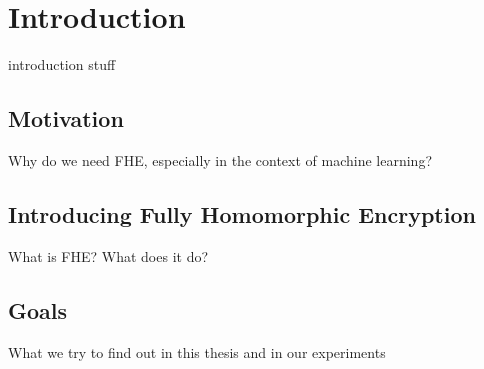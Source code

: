 \chapter{Introduction}\label{intro}

introduction stuff

\section{Motivation}

Why do we need FHE, especially in the context of machine learning?

\section{Introducing Fully Homomorphic Encryption}

What is FHE? What does it do?

\section{Goals}

What we try to find out in this thesis and in our experiments
